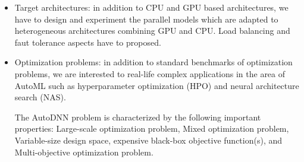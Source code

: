 \begin{itemize}
\begin{itemize}
\item Target architectures: in addition to CPU and GPU based architectures, we have to design and experiment the parallel models which are adapted to heterogeneous architectures combining GPU and CPU. Load balancing and faut tolerance aspects have to proposed.

\item Optimization problems: in addition to standard benchmarks of optimization problems, we are interested to real-life complex applications in the area of AutoML such as hyperparameter optimization (HPO) and neural architecture search (NAS).

The AutoDNN problem is characterized by the following important properties: Large-scale optimization problem, Mixed optimization problem, Variable-size design space, expensive black-box objective function(s), and Multi-objective optimization problem.

\end{itemize}

\end{itemize}

